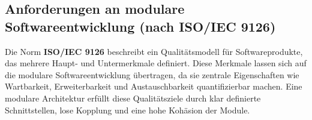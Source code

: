 \subsection{Anforderungen an modulare Softwareentwicklung (nach ISO/IEC 9126)}
\label{sec:anforderungen-an-modulare-softwareentwicklung-(nach-iso/iec-9126)}

Die Norm \textbf{ISO/IEC 9126} beschreibt ein Qualitätsmodell für Softwareprodukte, das mehrere Haupt- und Untermerkmale definiert.
Diese Merkmale lassen sich auf die modulare Softwareentwicklung übertragen, da sie zentrale Eigenschaften wie Wartbarkeit, Erweiterbarkeit und Austauschbarkeit quantifizierbar machen.
Eine modulare Architektur erfüllt diese Qualitätsziele durch klar definierte Schnittstellen, lose Kopplung und eine hohe Kohäsion der Module.\cite{ISOIEC9126-1991}

